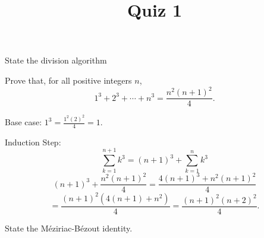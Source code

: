 \documentclass{exam}
\title{Quiz 1}
\begin{document}
\maketitle

\begin{questions}
  \question[5] State the division algorithm

  \question[5] Prove that, for all positive integers $n$,
  $$1^3 + 2^3 + \cdots + n^3 = \frac{n^2(n+1)^2}{4}.$$
  \begin{solution}
    Base case: $1^3 = \frac{1^2(2)^2}{4} = 1$.

    Induction Step: 
    $$\sum_{k=1}^{n+1} k^3 = (n+1)^3 + \sum_{k=1}^n k^3$$
    $$  (n+1)^3 + \frac{n^2(n+1)^2}{4}
    = \frac{ 4(n+1)^3 + n^2(n+1)^2 }{4}$$
    $$ = \frac{ (n+1)^2 ( 4(n+1) + n^2 ) }{4}
    = \frac{ (n+1)^2 (n+2)^2 }{4}.$$        
  \end{solution}


  \question[5]  State the M\'eziriac-B\'ezout identity.


\end{questions}
\end{document}
